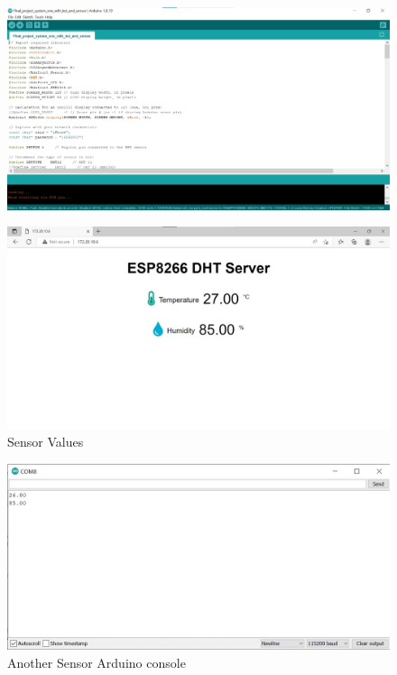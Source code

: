 \documentclass[12pt,a4paper,twocolumn,fleqn]{article}
\begin{document}
\begin{figure} [H]
\includegraphics[width=15cm]{media/out (4).jpeg}
\centering
\end{figure}
\begin{figure} [H]
\includegraphics[width=15cm]{media/WebPage Display.jpeg}
\centering
\caption{Sensor Values}
\end{figure}
\begin{figure} [H]
\includegraphics[width=15cm]{media/Sensor2.jpeg}
\centering
\caption{Another Sensor Arduino console}
\end{figure}
\end{document}
